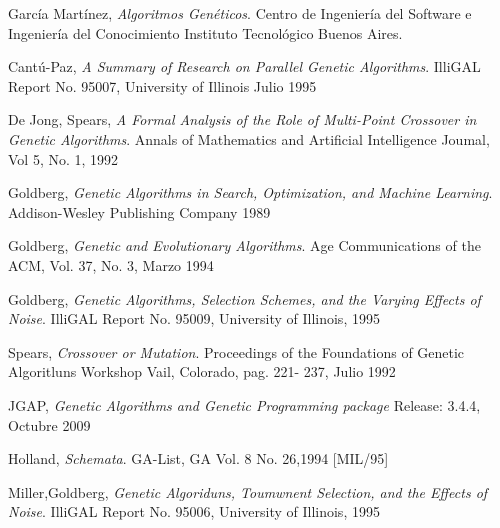 \documentclass[pdftex,a4paper,10.5pt]{article}
\begin{document}
\begin{thebibliography}{9}

 García Mart\'inez,
 \emph{Algoritmos Gen\'eticos}.
 Centro de Ingenier\'ia del Software e Ingenier\'ia del Conocimiento
 Instituto Tecnológico Buenos Aires. 

 Cant\'u-Paz,
 \emph{A Summary of Research on Parallel Genetic Algorithms}.
 IlliGAL Report No. 95007, University of Illinois
 Julio 1995

 De Jong, Spears,
 \emph{A Formal Analysis of the Role of Multi-Point Crossover in Genetic Algorithms}.
Annals of Mathematics and Artificial Intelligence Joumal,
 Vol 5, No. 1, 1992

 Goldberg,
 \emph{Genetic Algorithms in Search, Optimization, and Machine Learning}.
 Addison-Wesley Publishing Company
 1989
 
 Goldberg,
 \emph{Genetic and Evolutionary Algorithms}.
 Age Communications of the
 ACM, Vol. 37, No. 3, 
 Marzo 1994

 Goldberg,
 \emph{Genetic Algorithms, Selection Schemes, and the Varying Effects of Noise}.
 IlliGAL Report No. 95009, 
 University of Illinois, 
 1995
 
 Spears,
 \emph{Crossover or Mutation}.
 Proceedings of the Foundations of Genetic Algoritluns Workshop Vail, Colorado, pag. 221- 237,
 Julio 1992
 
 JGAP, 
 \emph{Genetic Algorithms and Genetic Programming package}
 Release: 3.4.4,
 Octubre 2009
 

 Holland,
 \emph{Schemata}.
  GA-List, GA Vol. 8 No. 26,1994 [MIL/95]
  
 Miller,Goldberg, 
 \emph{Genetic Algoriduns, Toumwnent Selection, and the Effects of Noise}.
 IlliGAL Report No. 95006, University of Illinois, 1995
  

  
\end{thebibliography}

\end{document}
